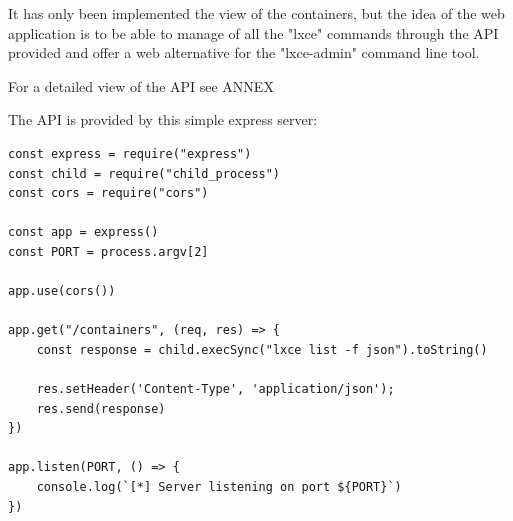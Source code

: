 It has only been implemented the view of the containers, but the idea of the web application is to be able to manage of all the "lxce" commands through the API provided and offer a web alternative for the "lxce-admin" command line tool.

For a detailed view of the API see ANNEX 


The API is provided by this simple express server:
\begin{verbatim}
const express = require("express")
const child = require("child_process")
const cors = require("cors")

const app = express()
const PORT = process.argv[2]

app.use(cors())

app.get("/containers", (req, res) => {
    const response = child.execSync("lxce list -f json").toString()

    res.setHeader('Content-Type', 'application/json');
    res.send(response)
})

app.listen(PORT, () => {
    console.log(`[*] Server listening on port ${PORT}`)
})
\end{verbatim}


